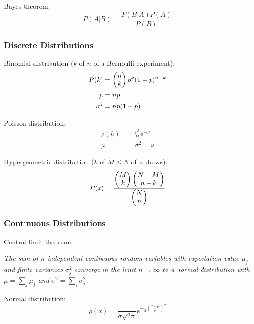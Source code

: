 			\noindent
			Bayes theorem:
			\begin{equation}
				P(A|B) = \frac{P(B|A)P(A)}{P(B)}
			\end{equation}

		\subsubsection{Discrete Distributions}
			\noindent
			Binomial distribution ($k$ of $n$ of a Bernoulli experiment):
			\begin{equation}
				\begin{aligned}
					P(k)&=\left(\begin{matrix}n\\k\end{matrix}\right)p^k(1-p)^{n-k} \\
					\mu &= np \\
					\sigma^2 &= np(1-p)
				\end{aligned}
			\end{equation}

			\noindent
			Poisson distribution:
			\begin{equation}
				\begin{aligned}
					\rho(k) &= \frac{\nu^k}{k!} e^{-\nu} \\
					\mu &= \sigma^2 = \nu
				\end{aligned}
			\end{equation}

			\noindent
			Hypergeometric distribution ($k$ of $M\le N$ of $n$ draws):
			\begin{equation}
				P(x)=\frac{\left(\begin{matrix}M\\k\end{matrix}\right)\left(\begin{matrix}N-M\\n-k\end{matrix}\right)}{\left(\begin{matrix}N\\n\end{matrix}\right)}
			\end{equation}

		\subsubsection{Continuous Distributions}
			\noindent
			Central limit theorem: \par
				\emph{The sum of $n$ independent continuous random variables with expectation value $\mu_j$ and finite variances $\sigma_j^2$ converge in the limit $n\rightarrow \infty$ to a normal distribution with $\mu = \sum_j \mu_j$ and $\sigma^2 = \sum_j \sigma_j^2$.} \vsp

			\noindent
			Normal distribution:
			\begin{equation}
				\rho(x)=\frac{1}{\sigma\sqrt{2\pi}}e^{-\frac{1}{2}\left(\frac{x-\mu}{\sigma}\right)^2}
			\end{equation}

